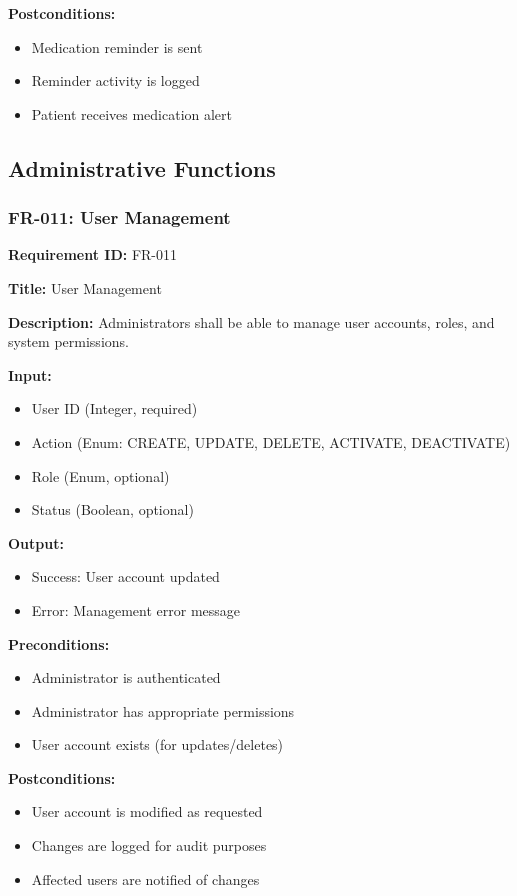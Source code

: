 \documentclass[12pt,a4paper]{article}
\begin{document}
\textbf{Postconditions:}
\begin{itemize}
    \item Medication reminder is sent
    \item Reminder activity is logged
    \item Patient receives medication alert
\end{itemize}

\subsection{Administrative Functions}

\subsubsection{FR-011: User Management}

\textbf{Requirement ID:} FR-011

\textbf{Title:} User Management

\textbf{Description:} Administrators shall be able to manage user accounts, roles, and system permissions.

\textbf{Input:}
\begin{itemize}
    \item User ID (Integer, required)
    \item Action (Enum: CREATE, UPDATE, DELETE, ACTIVATE, DEACTIVATE)
    \item Role (Enum, optional)
    \item Status (Boolean, optional)
\end{itemize}

\textbf{Output:}
\begin{itemize}
    \item Success: User account updated
    \item Error: Management error message
\end{itemize}

\textbf{Preconditions:}
\begin{itemize}
    \item Administrator is authenticated
    \item Administrator has appropriate permissions
    \item User account exists (for updates/deletes)
\end{itemize}

\textbf{Postconditions:}
\begin{itemize}
    \item User account is modified as requested
    \item Changes are logged for audit purposes
    \item Affected users are notified of changes
\end{itemize}
\end{document}

